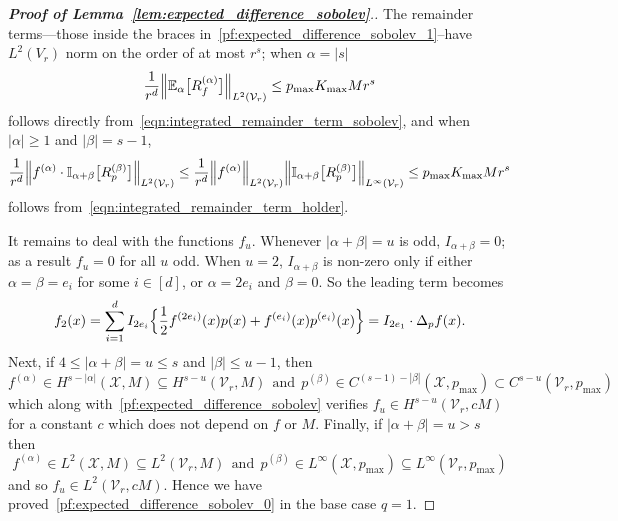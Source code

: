 \documentclass{article}
\newcommand{\abs}[1]{\left \lvert #1 \right \rvert}
\newcommand{\1}{\mathbf{1}}
\newcommand{\Xset}{\mathcal{X}}
\newcommand{\Vset}{\mathcal{V}}
\newcommand{\Leb}{L}
\newcommand{\Ebb}{\mathbb{E}}
\newcommand{\Ibb}{\mathbb{I}}
\theoremstyle{alden}
\theoremstyle{aldenthm}
\theoremstyle{definition}
\theoremstyle{remark}
\begin{document}
\begin{proof}[\textbf{Proof of Lemma~\ref{lem:expected_difference_sobolev}}.]
	The remainder terms---those inside the braces in~\eqref{pf:expected_difference_sobolev_1}--have $\Leb^2(V_r)$ norm on the order of at most $r^s$; when $\alpha = \abs{s}$
	\begin{equation*}
	\frac{1}{r^d} \Bigl\|\Ebb_{\alpha}\bigl[R_f^{(\alpha)}\bigr]\Bigr\|_{\Leb^2(\Vset_r)} \leq p_{\max} K_{\max} M r^s
	\end{equation*}
	follows directly from~\eqref{eqn:integrated_remainder_term_sobolev}, and when $\abs{\alpha} \geq 1$ and $\abs{\beta} = s - 1$,
	\begin{equation*}
	\frac{1}{r^d} \Bigl\|f^{(\alpha)} \cdot \Ibb_{\alpha + \beta}\bigl[R_p^{(\beta)}\bigr]\Bigr\|_{\Leb^2(\Vset_r)} \leq \frac{1}{r^d}\Big\|f^{(\alpha)} \Bigr\|_{\Leb^2(\Vset_r)} \Big\|\Ibb_{\alpha + \beta}\bigl[R_p^{(\beta)}\bigr]\Bigr\|_{\Leb^{\infty}(\Vset_r)} \leq p_{\max} K_{\max} M r^s
	\end{equation*}
	follows from~\eqref{eqn:integrated_remainder_term_holder}.
	
	It remains to deal with the functions $f_u$. Whenever $\abs{\alpha + \beta} = u$ is odd, $I_{\alpha + \beta} = 0$; as a result $f_u = 0$ for all $u$ odd. When $u = 2$, $I_{\alpha + \beta}$ is non-zero only if either $\alpha = \beta = e_i$ for some $i \in [d]$, or $\alpha = 2e_i$ and $\beta = 0$. So the leading term becomes
	\begin{equation*}
	f_2(x) = \sum_{i = 1}^{d} I_{2e_i}\Bigl\{\frac{1}{2}f^{(2e_i)}(x)p(x) + f^{(e_i)}(x)p^{(e_i)}(x)\Bigr\} = I_{2e_1} \cdot \Delta_pf(x).
	\end{equation*}
	Next, if $4 \leq \abs{\alpha + \beta} = u \leq s$ and $\abs{\beta} \leq u - 1$, then 
	\begin{equation*}
	f^{(\alpha)} \in H^{s - \abs{\alpha}}(\Xset,M) \subseteq H^{s - u}(\Vset_r,M) ~~\textrm{and}~~ p^{(\beta)} \in C^{(s - 1) - \abs{\beta}}(\Xset,p_{\max}) \subset C^{s - u}(\Vset_r,p_{\max})
	\end{equation*}
	which along with~\eqref{pf:expected_difference_sobolev} verifies $f_u \in H^{s - u}(\Vset_r,cM)$ for a constant $c$ which does not depend on $f$ or $M$. Finally, if $\abs{\alpha + \beta} = u > s$ then 
	\begin{equation*}
	f^{(\alpha)} \in \Leb^2(\Xset,M) \subseteq \Leb^2(\Vset_r,M) ~~\textrm{and}~~ p^{(\beta)} \in \Leb^{\infty}(\Xset,p_{\max}) \subseteq \Leb^{\infty}(\Vset_r,p_{\max})
	\end{equation*}
	and so $f_u \in \Leb^2(\Vset_r,cM)$. Hence we have proved~\eqref{pf:expected_difference_sobolev_0} in the base case $q = 1$.
	

\end{proof}
\end{document}
